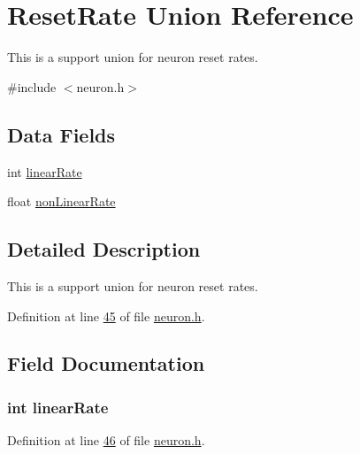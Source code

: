\hypertarget{union_reset_rate}{}\section{Reset\+Rate Union Reference}
\label{union_reset_rate}


This is a support union for neuron reset rates.  




{\ttfamily \#include $<$neuron.\+h$>$}

\subsection*{Data Fields}
\begin{DoxyCompactItemize}
\item 
int \hyperlink{union_reset_rate_a4bf8a23e4a9874ff73208c681eae1ced}{linear\+Rate}
\item 
float \hyperlink{union_reset_rate_a54aaba14ce85fd9c5d7b385d98727e36}{non\+Linear\+Rate}
\end{DoxyCompactItemize}


\subsection{Detailed Description}
This is a support union for neuron reset rates. 



Definition at line \hyperlink{neuron_8h_source_l00045}{45} of file \hyperlink{neuron_8h_source}{neuron.\+h}.



\subsection{Field Documentation}
\hypertarget{union_reset_rate_a4bf8a23e4a9874ff73208c681eae1ced}{}
\subsubsection[{linear\+Rate}]{\setlength{\rightskip}{0pt plus 5cm}int linear\+Rate}\label{union_reset_rate_a4bf8a23e4a9874ff73208c681eae1ced}


Definition at line \hyperlink{neuron_8h_source_l00046}{46} of file \hyperlink{neuron_8h_source}{neuron.\+h}.

\hypertarget{union_reset_rate_a54aaba14ce85fd9c5d7b385d98727e36}{}
